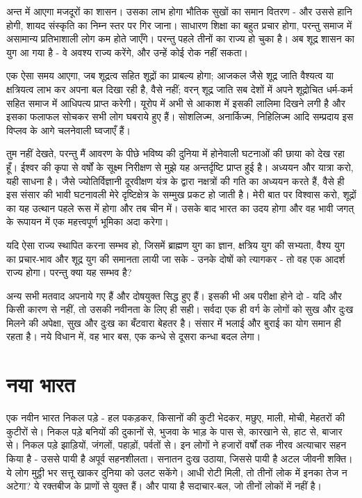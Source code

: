 \vskip 2pt

अन्त में आएगा मजदूरों का शासन। उसका लाभ होगा भौतिक सुखों का समान वितरण - और उससे हानि होगी, शायद संस्कृति का निम्न स्तर पर गिर जाना। साधारण शिक्षा का बहुत प्रचार होगा, परन्तु समाज में असामान्य प्रतिभाशाली लोग कम होते जाएँगे। परन्तु पहले तीनों का राज्य हो चुका है। अब शूद्र शासन का युग आ गया है - वे अवश्य राज्य करेंगे, और उन्हें कोई रोक नहीं सकता। 

\vskip 2pt

एक ऐसा समय आएगा, जब शूद्रत्व सहित शूद्रों का प्राबल्य होगा; आजकल जैसे शूद्र जाति वैश्यत्व या क्षत्रियत्व लाभ कर अपना बल दिखा रही है, वैसे नहीं; वरन् शूद्र जाति सब देशों में अपने शूद्रोचित धर्म-कर्म सहित समाज में आधिपत्य प्राप्त करेगी। यूरोप में अभी से आकाश में इसकी लालिमा दिखने लगी है और इसका फलाफल सोचकर सभी लोग घबराये हुए हैं। सोशलिज्म, अनार्किज्म, निहिलिज्म आदि सम्प्रदाय इस विप्लव के आगे चलनेवाली घ्वजाएँ हैं। 

तुम नहीं देखते, परन्तु मैं आवरण के पीछे भविष्य की दुनिया में होनेवाली घटनाओं की छाया को देख रहा हूँ। ईश्वर की कृपा से वर्षों के सूक्ष्म निरीक्षण से मुझे यह अन्तर्दृष्टि प्राप्त हुई है। अध्ययन और यात्रा करो, यही साधना है। जैसे ज्योतिर्विज्ञानी दूरवीक्षण यंत्र के द्वारा नक्षत्रों की गति का अध्ययन करते हैं, वैसे ही इस संसार की भावी घटनावली मेरे दृष्टिक्षेत्र के सम्मुख प्रकट हो जाती है। मेरी बात पर विश्वास करो, शूद्रों का यह उत्थान पहले रूस में होगा और तब चीन में। उसके बाद भारत का उदय होगा और वह भावी जगत् के रूपायन में एक महत्त्वपूर्ण भूमिका अदा करेगा। 

यदि ऐसा राज्य स्थापित करना सम्भव हो, जिसमें ब्राह्मण युग का ज्ञान, क्षत्रिय युग की सभ्यता, वैश्य युग का प्रचार-भाव और शूद्र युग की समानता लायी जा सके - उनके दोषों को त्यागकर - तो वह एक आदर्श राज्य होगा। परन्तु क्या यह सम्भव है? 

अन्य सभी मतवाद अपनाये गए हैं और दोषयुक्त सिद्ध हुए हैं। इसकी भी अब परीक्षा होने दो - यदि और किसी कारण से नहीं, तो उसकी नवीनता के लिए ही सही। सर्वदा एक ही वर्ग के लोगों को सुख और दुःख मिलने की अपेक्षा, सुख और दुःख का बँटवारा बेहतर है। संसार में भलाई और बुराई का योग समान ही रहता है। नये विधान में, वह भार बस, एक कन्धे से दूसरा कन्धा बदल लेगा।


\section*{नया भारत}


एक नवीन भारत निकल पड़े - हल पकड़कर, किसानों की कुटी भेदकर, मछुए, माली, मोची, मेहतरों की कुटीरों से। निकल पड़े बनियों की दुकानों से, भुजवा के भाड़ के पास से, कारखाने से, हाट से, बाजार से। निकल पड़े झाड़ियों, जंगलों, पहाड़ों, पर्वतों से। इन लोगों ने हजारों वर्षों तक नीरव अत्याचार सहन किया है - उससे पायी है अपूर्व सहनशीलता। सनातन दुःख उठाया, जिससे पायी है अटल जीवनी शक्ति। ये लोग मुट्ठी भर सत्तू खाकर दुनिया को उलट सकेंगे। आधी रोटी मिली, तो तीनों लोक में इनका तेज न अटेगा? ये रक्तबीज के प्राणों से युक्त हैं। और पाया है सदाचार-बल, जो तीनों लोकों में नहीं है। 

